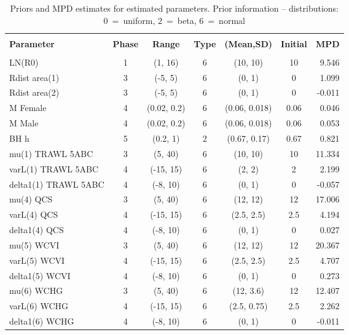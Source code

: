 \setlength{\tabcolsep}{2pt}
\begin{table}[!h]
\centering
\caption{Priors and MPD estimates for estimated parameters. Prior information -- distributions: 0~=~uniform, 2~=~beta, 6~=~normal}
\label{tab:parest}
\usefont{\encodingdefault}{\familydefault}{\seriesdefault}{\shapedefault}\small
\begin{tabular}{lcccccr}
\hline \\ [-1.5ex]
{\bf Parameter} & {\bf Phase} & {\bf Range} & {\bf Type} & {\bf (Mean,SD)} & {\bf Initial} & {\bf MPD} \\ [1ex]
\hline \\ [-1.5ex]
LN(R0) & 1 & (1, 16) & 6 & (10, 10) & 10 & 9.546 \\
Rdist area(1) & 3 & (-5, 5) & 6 & (0, 1) & 0 & 1.099 \\
Rdist area(2) & 3 & (-5, 5) & 6 & (0, 1) & 0 & -0.011 \\
M Female & 4 & (0.02, 0.2) & 6 & (0.06, 0.018) & 0.06 & 0.046 \\
M Male & 4 & (0.02, 0.2) & 6 & (0.06, 0.018) & 0.06 & 0.053 \\
BH h & 5 & (0.2, 1) & 2 & (0.67, 0.17) & 0.67 & 0.821 \\
mu(1) TRAWL 5ABC & 3 & (5, 40) & 6 & (10, 10) & 10 & 11.334 \\
varL(1) TRAWL 5ABC & 4 & (-15, 15) & 6 & (2, 2) & 2 & 2.199 \\
delta1(1) TRAWL 5ABC & 4 & (-8, 10) & 6 & (0, 1) & 0 & -0.057 \\
mu(4) QCS & 3 & (5, 40) & 6 & (12, 12) & 12 & 17.006 \\
varL(4) QCS & 4 & (-15, 15) & 6 & (2.5, 2.5) & 2.5 & 4.194 \\
delta1(4) QCS & 4 & (-8, 10) & 6 & (0, 1) & 0 & 0.027 \\
mu(5) WCVI & 3 & (5, 40) & 6 & (12, 12) & 12 & 20.367 \\
varL(5) WCVI & 4 & (-15, 15) & 6 & (2.5, 2.5) & 2.5 & 4.707 \\
delta1(5) WCVI & 4 & (-8, 10) & 6 & (0, 1) & 0 & 0.273 \\
mu(6) WCHG & 3 & (5, 40) & 6 & (12, 3.6) & 12 & 12.407 \\
varL(6) WCHG & 4 & (-15, 15) & 6 & (2.5, 0.75) & 2.5 & 2.262 \\
delta1(6) WCHG & 4 & (-8, 10) & 6 & (0, 1) & 0 & -0.011 \\

\end{tabular}
\end{table}
